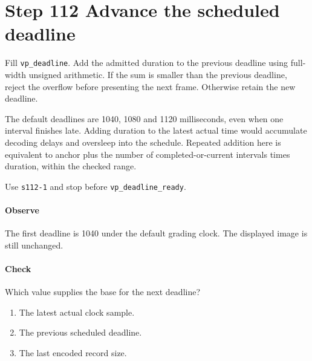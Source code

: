 \section{Step 112 Advance the scheduled deadline}
Fill \texttt{vp\_deadline}. Add the admitted duration to the previous deadline using full-width unsigned arithmetic. If the sum is smaller than the previous deadline, reject the overflow before presenting the next frame. Otherwise retain the new deadline.

The default deadlines are 1040, 1080 and 1120 milliseconds, even when one interval finishes late. Adding duration to the latest actual time would accumulate decoding delays and oversleep into the schedule. Repeated addition here is equivalent to anchor plus the number of completed-or-current intervals times duration, within the checked range.

Use \texttt{s112-1} and stop before \texttt{vp\_deadline\_ready}.

\paragraph{Observe} The first deadline is 1040 under the default grading clock. The displayed image is still unchanged.

\paragraph{Check} Which value supplies the base for the next deadline?
\begin{enumerate}[label=\Alph*.]
\item The latest actual clock sample.
\item The previous scheduled deadline.
\item The last encoded record size.
\end{enumerate}
